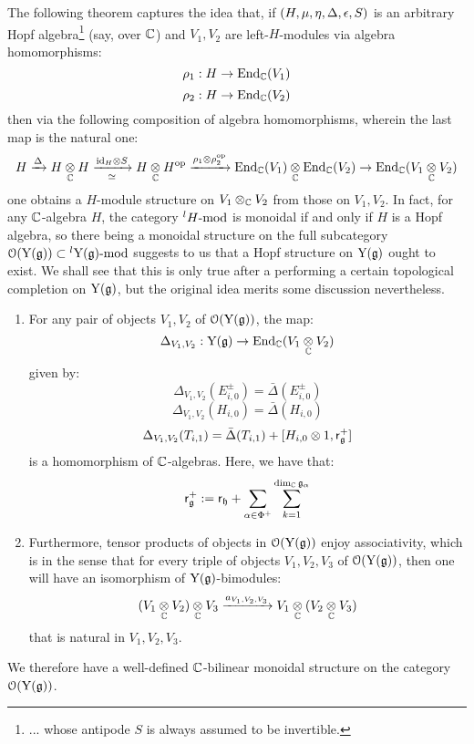         The following theorem captures the idea that, if $(H, \mu, \eta, \Delta, \e, S)$ is an arbitrary Hopf algebra\footnote{... whose antipode $S$ is always assumed to be invertible.} (say, over $\bbC$) and $V_1, V_2$ are left-$H$-modules via algebra homomorphisms:
            $$\rho_1: H \to \End_{\bbC}(V_1)$$
            $$\rho_2: H \to \End_{\bbC}(V_2)$$
        then via the following composition of algebra homomorphisms, wherein the last map is the natural one:
            $$H \xrightarrow[]{\Delta} H \tensor_{\bbC} H \xrightarrow[\cong]{\id_H \tensor S} H \tensor_{\bbC} H^{\op} \xrightarrow[]{\rho_1 \tensor \rho_2^{\op}} \End_{\bbC}(V_1) \tensor_{\bbC} \End_{\bbC}(V_2) \to \End_{\bbC}(V_1 \tensor_{\bbC} V_2)$$
        one obtains a $H$-module structure on $V_1 \tensor_{\bbC} V_2$ from those on $V_1, V_2$. In fact, for any $\bbC$-algebra $H$, the category ${}^lH\mod$ is monoidal if and only if $H$ is a Hopf algebra, so there being a monoidal structure on the full subcategory $\calO(\rmY(\g)) \subset {}^l\rmY(\g)\mod$ suggests to us that a Hopf structure on $\rmY(\g)$ ought to exist. We shall see that this is only true after a performing a certain topological completion on $\rmY(\g)$, but the original idea merits some discussion nevertheless. 
        \begin{theorem} \label{theorem: tensor_products_in_the_category_O_of_yangians}
            \begin{enumerate}
                \item \cite[Theorem 4.9]{guay_nakajima_wendlandt_affine_yangian_coproduct} For any pair of objects $V_1, V_2$ of $\calO(\rmY(\g))$, the map:
                    $$\Delta_{V_1, V_2}: \rmY(\g) \to \End_{\bbC}(V_1 \tensor_{\bbC} V_2)$$
                given by:
                    $$\Delta_{V_1, V_2}(E_{i, 0}^{\pm}) = \bar{\Delta}(E_{i, 0}^{\pm})$$
                    $$\Delta_{V_1, V_2}(H_{i, 0}) = \bar{\Delta}(H_{i, 0})$$
                    $$\Delta_{V_1, V_2}(T_{i, 1}) = \bar{\Delta}(T_{i, 1}) + [H_{i, 0} \tensor 1, \sfr_{\g}^+]$$
                is a homomorphism of $\bbC$-algebras. Here, we have that:
                    $$\sfr_{\g}^+ := \sfr_{\h} + \sum_{\alpha \in \Phi^+} \sum_{k = 1}^{\dim_{\bbC} \g_{\alpha}} $$
                \item \cite[Proposition 4.24]{guay_nakajima_wendlandt_affine_yangian_coproduct} Furthermore, tensor products of objects in $\calO(\rmY(\g))$ enjoy associativity, which is in the sense that for every triple of objects $V_1, V_2, V_3$ of $\calO(\rmY(\g))$, then one will have an isomorphism of $\rmY(\g)$-bimodules:
                    $$(V_1 \tensor_{\bbC} V_2) \tensor_{\bbC} V_3 \xrightarrow[]{a_{V_1, V_2, V_3}} V_1 \tensor_{\bbC} (V_2 \tensor_{\bbC} V_3)$$
                that is natural in $V_1, V_2, V_3$.
            \end{enumerate}
            We therefore have a well-defined $\bbC$-bilinear monoidal structure on the category $\calO(\rmY(\g))$. 
        \end{theorem}
    
